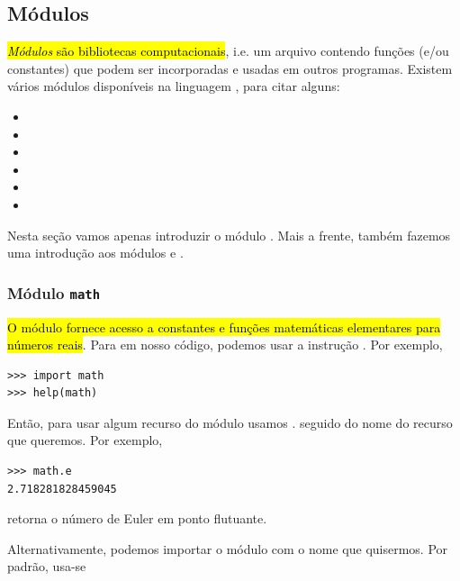 \subsection{Módulos}

\hl{\emph{Módulos} são bibliotecas computacionais}, i.e. um arquivo contendo funções (e/ou constantes) que podem ser incorporadas e usadas em outros programas. Existem vários módulos disponíveis na linguagem {\python}, para citar alguns:
\begin{itemize}
\item {\PYTHONmath} 
\item {\PYTHONrandom} 
\item {\PYTHONnumpy} 
\item {\PYTHONmatplotlib} 
\item {\PYTHONsympy} 
\item {\PYTHONtorch} 
\end{itemize}

Nesta seção vamos apenas introduzir o módulo {\PYTHONmath}. Mais a frente, também fazemos uma introdução aos módulos {\PYTHONnumpy} e {\PYTHONmatplotlib}.

\subsubsection{Módulo \texttt{math}}

\hl{O módulo {\PYTHONmath} fornece acesso a constantes e funções matemáticas elementares para números reais}. Para  em nosso código, podemos usar a instrução \hl{{\PYTHONimport}}. Por exemplo,

\begin{lstlisting}
>>> import math
>>> help(math)
\end{lstlisting}

Então, para usar algum recurso do módulo usamos {\PYTHONmath}. seguido do nome do recurso que queremos. Por exemplo,

\begin{lstlisting}
>>> math.e
2.718281828459045
\end{lstlisting}

retorna o número de Euler{\euler} em ponto flutuante.

Alternativamente, podemos importar o módulo com o nome que quisermos. Por padrão, usa-se

